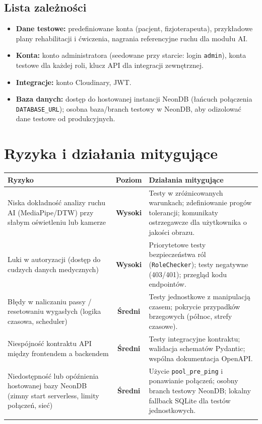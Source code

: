 \documentclass[11pt,a4paper]{article}
\begin{document}
\subsection{Lista zależności}
\begin{itemize}
  \item \textbf{Dane testowe:} predefiniowane konta (pacjent, fizjoterapeuta), przykładowe plany rehabilitacji i ćwiczenia, nagrania referencyjne ruchu dla modułu AI.
  \item \textbf{Konta:} konto administratora (seedowane przy starcie: login \texttt{admin}), konta testowe dla każdej roli, klucz API dla integracji zewnętrznej.
  \item \textbf{Integracje:} konto Cloudinary, JWT.
  \item \textbf{Baza danych:} dostęp do hostowanej instancji NeonDB (łańcuch połączenia \texttt{DATABASE\_URL}); osobna baza/branch testowy w NeonDB, aby odizolować dane testowe od produkcyjnych.
\end{itemize}

\section{Ryzyka i działania mitygujące}

\begin{longtable}{p{} c p{}}
\toprule
\textbf{Ryzyko} & \textbf{Poziom} & \textbf{Działania mitygujące} \\
\midrule
\endhead
Niska dokładność analizy ruchu AI (MediaPipe/DTW) przy słabym oświetleniu lub kamerze
 & \textcolor{riskhigh}{\textbf{Wysoki}}
 & Testy w zróżnicowanych warunkach; zdefiniowanie progów tolerancji; komunikaty ostrzegawcze dla użytkownika o jakości obrazu. \\
\addlinespace
Luki w autoryzacji (dostęp do cudzych danych medycznych)
 & \textcolor{riskhigh}{\textbf{Wysoki}}
 & Priorytetowe testy bezpieczeństwa ról (\texttt{RoleChecker}); testy negatywne (403/401); przegląd kodu endpointów. \\
\addlinespace
Błędy w naliczaniu passy / resetowaniu wygasłych (logika czasowa, scheduler)
 & \textcolor{riskmed}{\textbf{Średni}}
 & Testy jednostkowe z manipulacją czasem; pokrycie przypadków brzegowych (północ, strefy czasowe). \\
\addlinespace
Niespójność kontraktu API między frontendem a backendem
 & \textcolor{riskmed}{\textbf{Średni}}
 & Testy integracyjne kontraktu; walidacja schematów Pydantic; wspólna dokumentacja OpenAPI. \\
\addlinespace
Niedostępność lub opóźnienia hostowanej bazy NeonDB (zimny start serverless, limity połączeń, sieć)
 & \textcolor{riskmed}{\textbf{Średni}}
 & Użycie \texttt{pool\_pre\_ping} i ponawianie połączeń; osobny branch testowy NeonDB; lokalny fallback SQLite dla testów jednostkowych. \\
\addlinespace
\bottomrule
\end{longtable}
\end{document}
